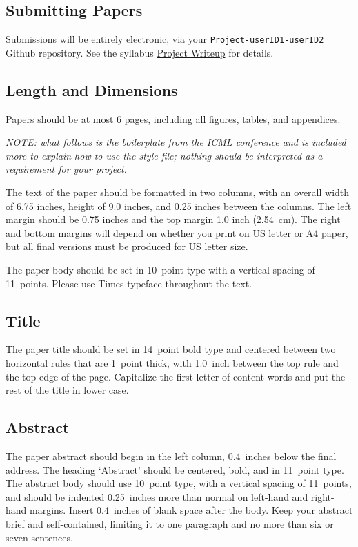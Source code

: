 \documentclass{article}
\begin{document}
\subsection{Submitting Papers}
\label{submit}

Submissions will be entirely electronic, via your {\tt Project-userID1-userID2}
Github repository.
See the syllabus \href{https://www.cs.swarthmore.edu/courses/CS66/S21/finalProject/}{Project Writeup} for details.

\subsection{Length and Dimensions}

Papers should be at most 6 pages, including all figures, tables,
and appendices.

{\em \noindent NOTE: what follows is the boilerplate from the ICML conference and is included more to explain how to use the style file; nothing should be
interpreted as a requirement for your project.}

The text of the paper should be formatted in two columns, with an
overall width of 6.75 inches, height of 9.0 inches, and 0.25 inches
between the columns. The left margin should be 0.75 inches and the top
margin 1.0 inch (2.54~cm). The right and bottom margins will depend on
whether you print on US letter or A4 paper, but all final versions
must be produced for US letter size.

The paper body should be set in 10~point type with a vertical spacing
of 11~points. Please use Times  typeface throughout the text.

\subsection{Title}

The paper title should be set in 14~point bold type and centered
between two horizontal rules that are 1~point thick, with 1.0~inch
between the top rule and the top edge of the page. Capitalize the
first letter of content words and put the rest of the title in lower
case.


\subsection{Abstract}

The paper abstract should begin in the left column, 0.4~inches below
the final address. The heading `Abstract' should be centered, bold,
and in 11~point type. The abstract body should use 10~point type, with
a vertical spacing of 11~points, and should be indented 0.25~inches
more than normal on left-hand and right-hand margins. Insert
0.4~inches of blank space after the body. Keep your abstract brief and
self-contained,
limiting it to one paragraph and no more than six or seven sentences.
\end{document}
